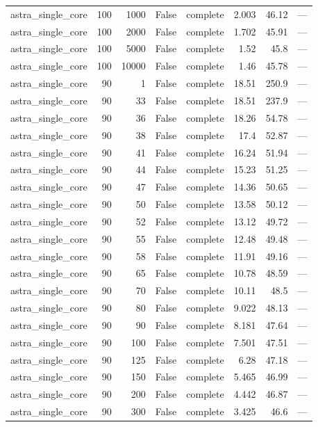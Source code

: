 \begin{tabular}{lrrrlrrl}
astra\_single\_core & 100 & 1000 & False & complete & 2.003 & 46.12 & — \\
astra\_single\_core & 100 & 2000 & False & complete & 1.702 & 45.91 & — \\
astra\_single\_core & 100 & 5000 & False & complete & 1.52 & 45.8 & — \\
astra\_single\_core & 100 & 10000 & False & complete & 1.46 & 45.78 & — \\
astra\_single\_core & 90 & 1 & False & complete & 18.51 & 250.9 & — \\
astra\_single\_core & 90 & 33 & False & complete & 18.51 & 237.9 & — \\
astra\_single\_core & 90 & 36 & False & complete & 18.26 & 54.78 & — \\
astra\_single\_core & 90 & 38 & False & complete & 17.4 & 52.87 & — \\
astra\_single\_core & 90 & 41 & False & complete & 16.24 & 51.94 & — \\
astra\_single\_core & 90 & 44 & False & complete & 15.23 & 51.25 & — \\
astra\_single\_core & 90 & 47 & False & complete & 14.36 & 50.65 & — \\
astra\_single\_core & 90 & 50 & False & complete & 13.58 & 50.12 & — \\
astra\_single\_core & 90 & 52 & False & complete & 13.12 & 49.72 & — \\
astra\_single\_core & 90 & 55 & False & complete & 12.48 & 49.48 & — \\
astra\_single\_core & 90 & 58 & False & complete & 11.91 & 49.16 & — \\
astra\_single\_core & 90 & 65 & False & complete & 10.78 & 48.59 & — \\
astra\_single\_core & 90 & 70 & False & complete & 10.11 & 48.5 & — \\
astra\_single\_core & 90 & 80 & False & complete & 9.022 & 48.13 & — \\
astra\_single\_core & 90 & 90 & False & complete & 8.181 & 47.64 & — \\
astra\_single\_core & 90 & 100 & False & complete & 7.501 & 47.51 & — \\
astra\_single\_core & 90 & 125 & False & complete & 6.28 & 47.18 & — \\
astra\_single\_core & 90 & 150 & False & complete & 5.465 & 46.99 & — \\
astra\_single\_core & 90 & 200 & False & complete & 4.442 & 46.87 & — \\
astra\_single\_core & 90 & 300 & False & complete & 3.425 & 46.6 & — \\

\end{tabular}
